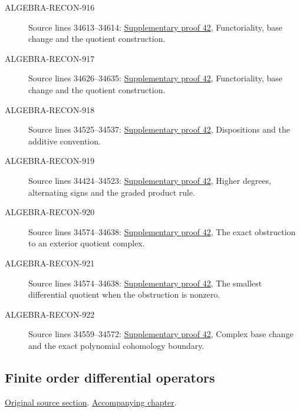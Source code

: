 \begin{description}
\item[ALGEBRA-RECON-916] Source lines 34613--34614: \hyperlink{algebra_de_rham_notes_20260928}{Supplementary proof 42}, Functoriality, base change and the quotient construction.
\item[ALGEBRA-RECON-917] Source lines 34626--34635: \hyperlink{algebra_de_rham_notes_20260928}{Supplementary proof 42}, Functoriality, base change and the quotient construction.
\item[ALGEBRA-RECON-918] Source lines 34525--34537: \hyperlink{algebra_de_rham_notes_20260928}{Supplementary proof 42}, Dispositions and the additive convention.
\item[ALGEBRA-RECON-919] Source lines 34424--34523: \hyperlink{algebra_de_rham_notes_20260928}{Supplementary proof 42}, Higher degrees, alternating signs and the graded product rule.
\item[ALGEBRA-RECON-920] Source lines 34574--34638: \hyperlink{algebra_de_rham_notes_20260928}{Supplementary proof 42}, The exact obstruction to an exterior quotient complex.
\item[ALGEBRA-RECON-921] Source lines 34574--34638: \hyperlink{algebra_de_rham_notes_20260928}{Supplementary proof 42}, The smallest differential quotient when the obstruction is nonzero.
\item[ALGEBRA-RECON-922] Source lines 34559--34572: \hyperlink{algebra_de_rham_notes_20260928}{Supplementary proof 42}, Complex base change and the exact polynomial cohomology boundary.
\end{description}

\subsection{Finite order differential operators}
\hypertarget{algebra-source-section-differential-operators}{}
\noindent\href{https://github.com/stacks/stacks-project/blob/a04446e57ec1fbc252a871afcec7752fb2807b14/algebra.tex\#L34651}{Original source section}. \href{algebra.pdf\#nameddest=section-differential-operators}{Accompanying chapter}.

